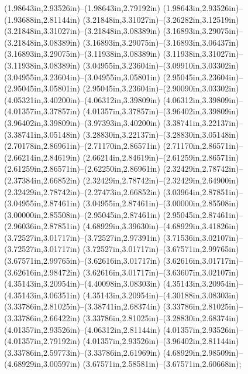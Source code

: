 (1.98643in,2.93526in)--(1.98643in,2.79192in) (1.98643in,2.93526in)--(1.93688in,2.81144in) (3.21848in,3.31027in)--(3.26282in,3.12519in) (3.21848in,3.31027in)--(3.21848in,3.08389in) (3.16893in,3.29075in)--(3.21848in,3.08389in) (3.16893in,3.29075in)--(3.16893in,3.06437in) (3.16893in,3.29075in)--(3.11938in,3.08389in) (3.11938in,3.31027in)--(3.11938in,3.08389in) (3.04955in,3.23604in)--(3.09910in,3.03302in) (3.04955in,3.23604in)--(3.04955in,3.05801in) (2.95045in,3.23604in)--(2.95045in,3.05801in) (2.95045in,3.23604in)--(2.90090in,3.03302in) (4.05321in,3.40200in)--(4.06312in,3.39809in) (4.06312in,3.39809in)--(4.01357in,3.37857in) (4.01357in,3.37857in)--(3.96402in,3.39809in) (3.96402in,3.39809in)--(3.97393in,3.40200in) (3.38741in,3.22137in)--(3.38741in,3.05148in) (3.28830in,3.22137in)--(3.28830in,3.05148in) (2.70178in,2.86961in)--(2.71170in,2.86571in) (2.71170in,2.86571in)--(2.66214in,2.84619in) (2.66214in,2.84619in)--(2.61259in,2.86571in) (2.61259in,2.86571in)--(2.62250in,2.86961in) (2.32429in,2.78742in)--(2.37384in,2.66852in) (2.32429in,2.78742in)--(2.32429in,2.64900in) (2.32429in,2.78742in)--(2.27473in,2.66852in) (3.03964in,2.87851in)--(3.04955in,2.87461in) (3.04955in,2.87461in)--(3.00000in,2.85508in) (3.00000in,2.85508in)--(2.95045in,2.87461in) (2.95045in,2.87461in)--(2.96036in,2.87851in) (4.68929in,3.39630in)--(4.68929in,3.41826in) (3.72527in,3.01717in)--(3.72527in,2.97391in) (3.71536in,3.02107in)--(3.72527in,3.01717in) (3.72527in,3.01717in)--(3.67571in,2.99765in) (3.67571in,2.99765in)--(3.62616in,3.01717in) (3.62616in,3.01717in)--(3.62616in,2.98472in) (3.62616in,3.01717in)--(3.63607in,3.02107in) (4.35143in,3.20954in)--(4.40098in,3.08303in) (4.35143in,3.20954in)--(4.35143in,3.06351in) (4.35143in,3.20954in)--(4.30188in,3.08303in) (3.33786in,2.81025in)--(3.38741in,2.68374in) (3.33786in,2.81025in)--(3.33786in,2.66422in) (3.33786in,2.81025in)--(3.28830in,2.68374in) (4.01357in,2.93526in)--(4.06312in,2.81144in) (4.01357in,2.93526in)--(4.01357in,2.79192in) (4.01357in,2.93526in)--(3.96402in,2.81144in) (3.33786in,2.59773in)--(3.33786in,2.61969in) (4.68929in,2.98509in)--(4.68929in,3.00597in) (3.67571in,2.58581in)--(3.67571in,2.60668in);
